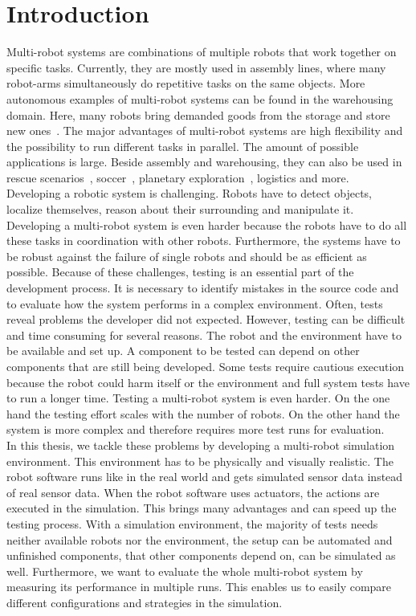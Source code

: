 \chapter{Introduction}

Multi-robot systems are combinations of multiple robots that work together on specific tasks. Currently, they are mostly used in assembly lines, where many robot-arms simultaneously do repetitive tasks on the same objects. More autonomous examples of multi-robot systems can be found in the warehousing domain. Here, many robots bring demanded goods from the storage and store new ones~\cite{Kiva}. The major advantages of multi-robot systems are high flexibility and the possibility to run different tasks in parallel. The amount of possible applications is large. Beside assembly and warehousing, they can also be used in rescue scenarios~\cite{mas_rescue}, soccer~\cite{mas_soccer}, planetary exploration~\cite{mas_space}, logistics and more.\\
Developing a robotic system is challenging. Robots have to detect objects, localize themselves, reason about their surrounding and manipulate it. Developing a multi-robot system is even harder because the robots have to do all these tasks in coordination with other robots. Furthermore, the systems have to be robust against the failure of single robots and should be as efficient as possible. Because of these challenges, testing is an essential part of the development process. It is necessary to identify mistakes in the source code and to evaluate how the system performs in a complex environment. Often, tests reveal problems the developer did not expected. However, testing can be difficult and time consuming for several reasons. The robot and the environment have to be available and set up. A component to be tested can depend on other components that are still being developed. Some tests require cautious execution because the robot could harm itself or the environment and full system tests have to run a longer time. Testing a multi-robot system is even harder. On the one hand the testing effort scales with the number of robots. On the other hand the system is more complex and therefore requires more test runs for evaluation.\\
In this thesis, we tackle these problems by developing a multi-robot simulation environment. This environment has to be physically and visually realistic. The robot software runs like in the real world and gets simulated sensor data instead of real sensor data. When the robot software uses actuators, the actions are executed in the simulation. This brings many advantages and can speed up the testing process. With a simulation environment, the majority of tests needs neither available robots nor the environment, the setup can be automated and unfinished components, that other components depend on, can be simulated as well. Furthermore, we want to evaluate the whole multi-robot system by measuring its performance in multiple runs. This enables us to easily compare different configurations and strategies in the simulation.\\
